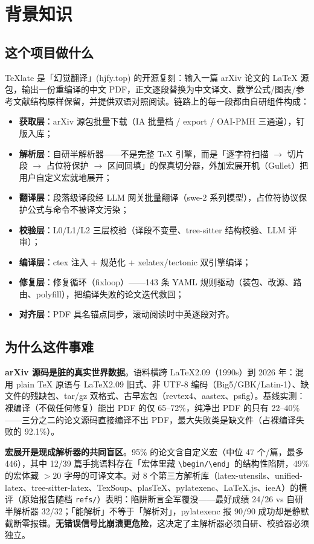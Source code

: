 \section{背景知识}

\subsection{这个项目做什么}

TeXlate 是「幻觉翻译」(hjfy.top) 的开源复刻：输入一篇 arXiv 论文的 LaTeX 源包，输出一份重编译的中文 PDF，正文逐段替换为中文译文、数学公式/图表/参考文献结构原样保留，并提供双语对照阅读。链路上的每一段都由自研组件构成：

\begin{itemize}
  \item \textbf{获取层}：arXiv 源包批量下载（IA 批量档 / export / OAI-PMH 三通道），钉版入库；
  \item \textbf{解析层}：自研半解析器——不是完整 TeX 引擎，而是「逐字符扫描 $\to$ 切片段 $\to$ 占位符保护 $\to$ 区间回填」的保真切分器，外加宏展开机（Gullet）把用户自定义宏就地展开；
  \item \textbf{翻译层}：段落级译段经 LLM 网关批量翻译（swe-2 系列模型），占位符协议保护公式与命令不被译文污染；
  \item \textbf{校验层}：L0/L1/L2 三层校验（译段不变量、tree-sitter 结构校验、LLM 评审）；
  \item \textbf{编译层}：ctex 注入 + 规范化 + xelatex/tectonic 双引擎编译；
  \item \textbf{修复层}：修复循环（fixloop）——143 条 YAML 规则驱动（装包、改源、路由、polyfill），把编译失败的论文迭代救回；
  \item \textbf{对齐层}：PDF 具名锚点同步，滚动阅读时中英逐段对齐。
\end{itemize}

\subsection{为什么这件事难}

\textbf{arXiv 源码是脏的真实世界数据}。语料横跨 LaTeX2.09（1990s）到 2026 年：混用 plain \TeX{} 原语与 LaTeX2.09 旧式、非 UTF-8 编码（Big5/GBK/Latin-1）、缺文件的残缺包、tar/gz 双格式、古早宏包（revtex4、aastex、psfig）。基线实测：裸编译（不做任何修复）能出 PDF 的仅 65--72\%，纯净出 PDF 的只有 22--40\%——三分之二的论文源码直接编译不出 PDF，最大失败类是缺文件（占裸编译失败的 92.1\%）。

\textbf{宏展开是现成解析器的共同盲区}。95\% 的论文含自定义宏（中位 47 个/篇，最多 446），其中 12/39 篇手挑语料存在「宏体里藏 \verb|\begin/\end|」的结构性陷阱，49\% 的宏体藏 $>20$ 字母的可译文本。对 8 个第三方解析库（latex-utensils、unified-latex、tree-sitter-latex、TexSoup、plasTeX、pylatexenc、LaTeX.js、ieeA）的横评（原始报告随档 \texttt{refs/}）表明：陷阱断言全军覆没——最好成绩 24/26 vs 自研半解析器 32/32；「能解析」不等于「解析对」，pylatexenc 报 90/90 成功却是静默截断零报错。\textbf{无错误信号比崩溃更危险}，这决定了主解析器必须自研、校验器必须独立。

